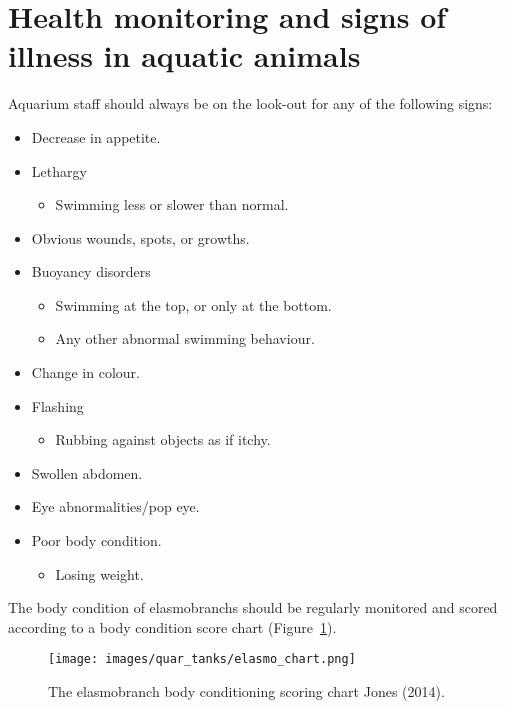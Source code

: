 \documentclass[
  letterpaper,
  DIV=11,
  numbers=noendperiod]{scrreprt}
\providecommand{\tightlist}{%
  \setlength{\itemsep}{0pt}\setlength{\parskip}{0pt}}\usepackage{longtable,booktabs,array}
\begin{document}
\hypertarget{sec-diease-signs}{%
\section{Health monitoring and signs of illness in aquatic
animals}\label{sec-diease-signs}}

Aquarium staff should always be on the look-out for any of the following
signs:

\begin{itemize}
\tightlist
\item
  Decrease in appetite.
\item
  Lethargy

  \begin{itemize}
  \tightlist
  \item
    Swimming less or slower than normal.
  \end{itemize}
\item
  Obvious wounds, spots, or growths.
\item
  Buoyancy disorders

  \begin{itemize}
  \tightlist
  \item
    Swimming at the top, or only at the bottom.\\
  \item
    Any other abnormal swimming behaviour.
  \end{itemize}
\item
  Change in colour.
\item
  Flashing

  \begin{itemize}
  \tightlist
  \item
    Rubbing against objects as if itchy.
  \end{itemize}
\item
  Swollen abdomen.
\item
  Eye abnormalities/pop eye.
\item
  Poor body condition.

  \begin{itemize}
  \tightlist
  \item
    Losing weight.
  \end{itemize}
\end{itemize}

The body condition of elasmobranchs should be regularly monitored and
scored according to a body condition score chart
(Figure~\ref{fig-elasmochart}).

\begin{figure}[H]

{\centering \texttt{[image: images/quar\_tanks/elasmo\_chart.png]}

}

\caption{\label{fig-elasmochart}The elasmobranch body conditioning
scoring chart Jones (2014).}

\end{figure}
\end{document}

